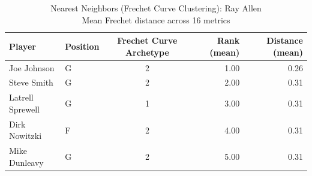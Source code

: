 \begin{table}[t]
\caption*{
{\fontsize{20}{25} Nearest Neighbors (Frechet Curve Clustering): Ray Allen\fontsize{12}{15}\selectfont } \\ 
{\fontsize{14}{17}\selectfont  Mean Frechet distance across 16 metrics\fontsize{12}{15}\selectfont }
} 
\fontsize{12.0pt}{14.0pt}\selectfont
\begin{tabular*}{\linewidth}{@{\extracolsep{\fill}}llcrr}
\toprule
Player & Position & Frechet Curve Archetype & Rank (mean) & Distance (mean) \\ 
\midrule\addlinespace[2.5pt]
Joe Johnson & G & 2 & 1.00 & 0.26 \\ 
Steve Smith & G & 2 & 2.00 & 0.31 \\ 
Latrell Sprewell & G & 1 & 3.00 & 0.31 \\ 
Dirk Nowitzki & F & 2 & 4.00 & 0.31 \\ 
Mike Dunleavy & G & 2 & 5.00 & 0.31 \\ 
\bottomrule
\end{tabular*}
\end{table}

